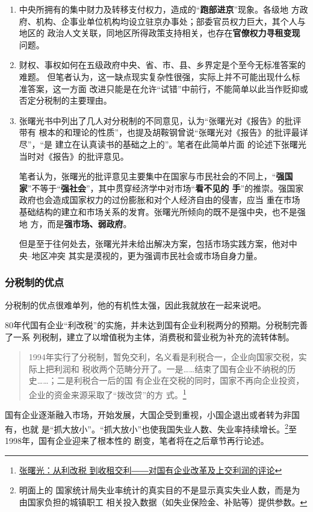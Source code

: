 \begin{enumerate}
\item 中央所拥有的集中财力及转移支付权力，造成的“\textbf{跑部进京}”现象。各级地
  方政府、机构、企事业单位机构均设立驻京办事处；部委官员权力巨大，其个人与地区的
  政治人文关联，同地区所得政策支持相关，也存在\textbf{官僚权力寻租变现}问题。

\item 财权、事权如何在五级政府中央、省、市、县、乡界定是个至今无标准答案的难题。
  但笔者认为，这一缺点现实复杂性很强，实际上并不可能出现什么标准答案，这一方面
  改进只能是在允许“试错”中前行，不能简单以此当作贬抑或否定分税制的主要理由。

\item 张曙光书中列出了几人对分税制的不同意见，认为“张曙光对《报告》的批评带有
  根本的和理论的性质”，也提及胡鞍钢曾说“张曙光对《报告》的批评最详尽”，“是
  建立在认真读书的基础之上的”。笔者在此简单片面
  的论述下张曙光当时对《报告》的批评意见。

  笔者认为，张曙光的批评意见主要集中在国家与市民社会的不同上，“\textbf{强国
    家}”不等于“\textbf{强社会}”，其中贯穿经济学中对市场“\textbf{看不见的
    手}”的推崇。强国家政府也会造成国家权力的过份膨胀和对个人经济自由的侵害，应当
  重在市场基础结构的建立和市场关系的发育。张曙光所倾向的既不是强中央，也不是强地
  方，而是\textbf{强市场、弱政府}。

  但是至于往何处去，张曙光并未给出解决方案，包括市场实践方案，他对中央--地区冲突
  其实是漠视的，更为强调市民社会或市场自身力量。
\end{enumerate}


\subsubsection{分税制的优点}

分税制的优点很难单列，他的有机性太强，因此我就放在一起来说吧。

80年代国有企业“利改税”的实施，并未达到国有企业利税两分的预期。分税制完善了一系
列税制，建立了以增值税为主体，消费税和营业税为补充的流转体制。
\begin{quotation}
  1994年实行了分税制，暂免交利，名义看是利税合一，企业向国家交税，实际上把利润和
  税收两个范畴分开了。一是……结束了国有企业不纳税的历史……；二是利税合一后的国
  有企业在交税的同时，国家不再向企业投资，企业的资金来源采取了“拨改贷”的方
  式。\footnote{\href{http://www.aisixiang.com/data/28752.html}{张曙光：从利改税
      到收租交利――对国有企业改革及上交利润的评论}}
\end{quotation}
国有企业逐渐融入市场，开始发展，大国企受到重视，小国企退出或者转为非国有，也就
是“抓大放小”。“抓大放小”也使我国失业人数、失业率持续增长。\footnote{明面上的
  国家统计局失业率统计的真实目的不是显示真实失业人数，而是为由国家负担的城镇职工
  相关投入数据（如失业保险金、补贴等）提供参数。}至1998年，国有企业迎来了根本性的
剧变，笔者将在之后章节再行论述。

